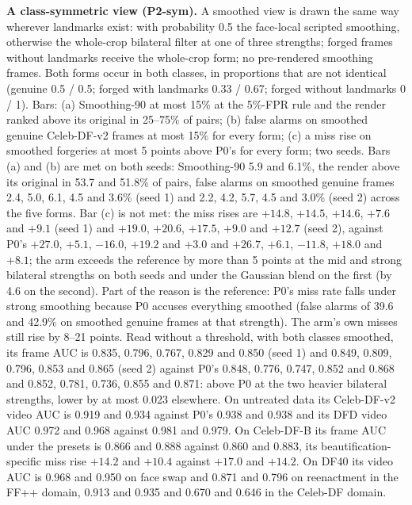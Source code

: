 \documentclass[10pt]{article}
\begin{document}
\textbf{A class-symmetric view (P2-sym).} A smoothed view is drawn the same way wherever landmarks exist: with probability 0.5 the
face-local scripted smoothing, otherwise the whole-crop bilateral filter at one of three strengths; forged frames without landmarks
receive the whole-crop form; no pre-rendered smoothing frames. Both forms occur in both classes, in proportions that are not
identical (genuine 0.5 / 0.5; forged with landmarks 0.33 / 0.67; forged without landmarks 0 / 1). Bars: (a) Smoothing-90 at most
15\% at the 5\%-FPR rule and the render ranked above its original in 25--75\% of pairs; (b) false alarms on smoothed genuine
Celeb-DF-v2 frames at most 15\% for every form; (c) a miss rise on smoothed forgeries at most 5 points above P0's for every form; two
seeds. Bars (a) and (b) are met on both seeds: Smoothing-90 5.9 and 6.1\%, the render above its original in 53.7 and 51.8\% of pairs,
false alarms on smoothed genuine frames 2.4, 5.0, 6.1, 4.5 and 3.6\% (seed 1) and 2.2, 4.2, 5.7, 4.5 and 3.0\% (seed 2) across the
five forms. Bar (c) is not met: the miss rises are $+14.8$, $+14.5$, $+14.6$, $+7.6$ and $+9.1$ (seed 1) and $+19.0$, $+20.6$,
$+17.5$, $+9.0$ and $+12.7$ (seed 2), against P0's $+27.0$, $+5.1$, $-16.0$, $+19.2$ and $+3.0$ and $+26.7$, $+6.1$, $-11.8$, $+18.0$
and $+8.1$; the arm exceeds the reference by more than 5 points at the mid and strong bilateral strengths on both seeds and under
the Gaussian blend on the first (by 4.6 on the second). Part of the reason is the reference: P0's miss rate falls under strong
smoothing because P0 accuses everything smoothed (false alarms of 39.6 and 42.9\% on smoothed genuine frames at that strength). The
arm's own misses still rise by 8--21 points. Read without a threshold, with both classes smoothed, its frame AUC is 0.835, 0.796,
0.767, 0.829 and 0.850 (seed 1) and 0.849, 0.809, 0.796, 0.853 and 0.865 (seed 2) against P0's 0.848, 0.776, 0.747, 0.852 and 0.868
and 0.852, 0.781, 0.736, 0.855 and 0.871: above P0 at the two heavier bilateral strengths, lower by at most 0.023 elsewhere. On
untreated data its Celeb-DF-v2 video AUC is 0.919 and 0.934 against P0's 0.938 and 0.938 and its DFD video AUC 0.972 and 0.968
against 0.981 and 0.979. On Celeb-DF-B its frame AUC under the presets is 0.866 and 0.888 against 0.860 and 0.883, its
beautification-specific miss rise $+14.2$ and $+10.4$ against $+17.0$ and $+14.2$. On DF40 its video AUC is 0.968 and 0.950 on face
swap and 0.871 and 0.796 on reenactment in the FF++ domain, 0.913 and 0.935 and 0.670 and 0.646 in the Celeb-DF domain.
\end{document}
